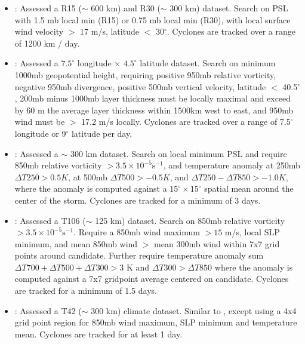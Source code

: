\documentclass[gmdd, hvmath, online]{copernicus_discussions}
\begin{document}
\begin{itemize}
\item \cite{broccoli1990existing}: Assessed a R15 ($\sim$ 600 km) and R30 ($\sim$ 300 km) dataset.  Search on PSL with 1.5 mb local min (R15) or 0.75 mb local min (R30), with local surface wind velocity $>$ 17 m/s, latitude $<$ 30$^\circ$.  Cyclones are tracked over a range of 1200 km / day.

\item \cite{wu1992gcm}: Assessed a $7.5^\circ$ longitude $\times$ $4.5^\circ$ latitude dataset.  Search on minimum 1000mb geopotential height, requiring positive 950mb relative vorticity, negative 950mb divergence, positive 500mb vertical velocity, latitude $<$ 40.5$^\circ$, 200mb minus 1000mb layer thickness must be locally maximal and exceed by 60 m the average layer thickness within 1500km west to east, and 950mb wind must be $>$ 17.2 m/s locally.  Cyclones are tracked over a range of 7.5$^\circ$ longitude or 9$^\circ$ latitude per day.

\item \cite{haarsma1993tropical}: Assessed a $\sim$ 300 km dataset.  Search on local minimum PSL and require 850mb relative vorticity $> 3.5 \times 10^{-5} \mbox{s}^{-1}$, and temperature anomaly at 250mb $\Delta T250 > 0.5 K$, at 500mb $\Delta T500 > -0.5 K$, and $\Delta T250 - \Delta T850 > -1.0 K$, where the anomaly is computed against a $15^\circ \times 15^\circ$ spatial mean around the center of the storm.  Cyclones are tracked for a minimum of 3 days.

\item \cite{bengtsson1995hurricane, bengtsson1996will}:  Assessed a T106 ($\sim$ 125 km) dataset.  Search on 850mb relative vorticity $> 3.5 \times 10^{-5} \mbox{s}^{-1}$.  Require a 850mb wind maximum $> 15$ m/s, local SLP minimum, and mean 850mb wind $>$ mean 300mb wind within 7x7 grid points around candidate.  Further require temperature anomaly sum $\Delta T700+ \Delta T500+ \Delta T300 > 3$ K and $\Delta T300 > \Delta T850$ where the anomaly is computed against a 7x7 gridpoint average centered on candidate.  Cyclones are tracked for a minimum of 1.5 days.

\item \cite{krishnamurti1998impact}:  Assessed a T42 ($\sim$ 300 km) climate dataset.  Similar to \cite{bengtsson1995hurricane, bengtsson1996will}, except using a 4x4 grid point region for 850mb wind maximum, SLP minimum and temperature mean.  Cyclones are tracked for at least 1 day.


\end{itemize}
\end{document}
